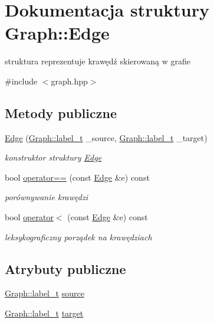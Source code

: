 \hypertarget{structGraph_1_1Edge}{\section{Dokumentacja struktury Graph\-:\-:Edge}
\label{structGraph_1_1Edge}
}


struktura reprezentuje krawędź skierowaną w grafie  




{\ttfamily \#include $<$graph.\-hpp$>$}

\subsection*{Metody publiczne}
\begin{DoxyCompactItemize}
\item 
\hyperlink{structGraph_1_1Edge_a8921760bce6405458d135f8fff36da33}{Edge} (\hyperlink{classGraph_a2237a0ada8484c37b8200c0e3685ca71}{Graph\-::label\-\_\-t} \-\_\-source, \hyperlink{classGraph_a2237a0ada8484c37b8200c0e3685ca71}{Graph\-::label\-\_\-t} \-\_\-target)
\begin{DoxyCompactList}\small\item\em konstruktor struktury \hyperlink{structGraph_1_1Edge}{Edge} \end{DoxyCompactList}\item 
bool \hyperlink{structGraph_1_1Edge_af08616db0154985676b4ef48460d70bd}{operator==} (const \hyperlink{structGraph_1_1Edge}{Edge} \&e) const 
\begin{DoxyCompactList}\small\item\em porównywanie krawędzi \end{DoxyCompactList}\item 
bool \hyperlink{structGraph_1_1Edge_af6f25b416c2e1b3f67ffd709e2d2951d}{operator$<$} (const \hyperlink{structGraph_1_1Edge}{Edge} \&e) const 
\begin{DoxyCompactList}\small\item\em leksykograficzny porządek na krawędziach \end{DoxyCompactList}\end{DoxyCompactItemize}
\subsection*{Atrybuty publiczne}
\begin{DoxyCompactItemize}
\item 
\hyperlink{classGraph_a2237a0ada8484c37b8200c0e3685ca71}{Graph\-::label\-\_\-t} \hyperlink{structGraph_1_1Edge_a8111b5ffa036e48e4d1c4e55e8cf37d8}{source}
\item 
\hyperlink{classGraph_a2237a0ada8484c37b8200c0e3685ca71}{Graph\-::label\-\_\-t} \hyperlink{structGraph_1_1Edge_a10c3c3116be32c39949fd6de3c03d9fa}{target}
\end{DoxyCompactItemize}


